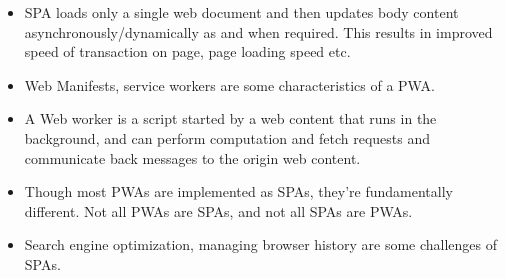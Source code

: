 \documentclass[a4paper]{article}
\begin{document}
\begin{itemize}
    \item SPA loads only a single web document and then updates body content asynchronously/dynamically as and when required. This results in improved  speed of transaction on page, page loading speed etc.
    \item Web Manifests, service workers are some characteristics of a PWA.
    \item A Web worker is a script started by a web content that runs in the background, and  can perform computation and fetch requests and communicate back messages to the origin web content.
    \item Though most PWAs are implemented as SPAs, they’re fundamentally different. Not all PWAs are SPAs, and not all SPAs are PWAs.
    \item Search engine optimization, managing browser history are some challenges of SPAs.
\end{itemize}
\end{document}
